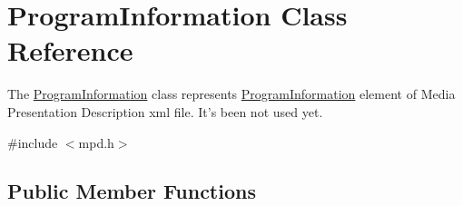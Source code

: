 \hypertarget{class_program_information}{\section{Program\-Information Class Reference}
\label{class_program_information}
}


The \hyperlink{class_program_information}{Program\-Information} class represents \hyperlink{class_program_information}{Program\-Information} element of Media Presentation Description xml file. It's been not used yet.  




{\ttfamily \#include $<$mpd.\-h$>$}

\subsection*{Public Member Functions}
